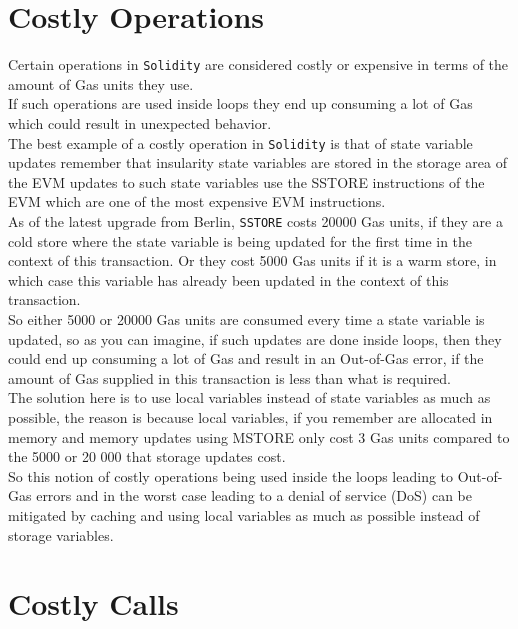 \section{Costly Operations}

Certain operations in \texttt{Solidity} are considered costly or expensive in terms of the amount of Gas units they use. \\

If such operations are used inside loops they end up consuming a lot of Gas which could result in unexpected behavior.\\

The best example of a costly operation in \texttt{Solidity} is that of state variable updates remember that insularity state variables are stored in the storage area of the EVM updates to such state variables use the SSTORE instructions of the EVM which are one of the most expensive EVM instructions.\\

As of the latest upgrade from Berlin, \texttt{SSTORE} costs 20000 Gas units, if they are a cold store where the state variable is being updated for the first time in the context of this transaction. Or they cost 5000 Gas units if it is a warm store, in which case this variable has already been updated in the context of this transaction.\\

So either 5000 or 20000 Gas units are consumed every time a state variable is updated, so as you can imagine, if such updates are done inside loops, then they could end up consuming a lot of Gas and result in an Out-of-Gas error, if the amount of Gas supplied in this transaction is less than what is required.\\

The solution here is to use local variables instead of state variables as much as possible, the reason is because local variables, if you remember are allocated in memory and memory updates using MSTORE only cost 3 Gas units compared to the 5000 or 20 000 that storage updates cost. \\

So this notion of costly operations being used inside the loops leading to Out-of-Gas errors and in the worst case leading to a denial of service (DoS) can be mitigated by caching and using local variables as much as possible instead of storage variables.

\section{Costly Calls}


